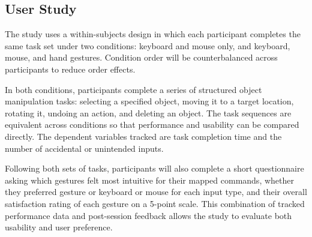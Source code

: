 \documentclass[sigconf]{acmart}
\begin{document}
\subsection{User Study}

The study uses a within-subjects design in which each participant completes the same task set under two conditions: keyboard and mouse only, and keyboard, mouse, and hand gestures. Condition order will be counterbalanced across participants to reduce order effects.

In both conditions, participants complete a series of structured object manipulation tasks: selecting a specified object, moving it to a target location, rotating it, undoing an action, and deleting an object. The task sequences are equivalent across conditions so that performance and usability can be compared directly. The dependent variables tracked are task completion time and the number of accidental or unintended inputs.

Following both sets of tasks, participants will also complete a short questionnaire asking which gestures felt most intuitive for their mapped commands, whether they preferred gesture or keyboard or mouse for each input type, and their overall satisfaction rating of each gesture on a 5-point scale. This combination of tracked performance data and post-session feedback allows the study to evaluate both usability and user preference.




\end{document}
